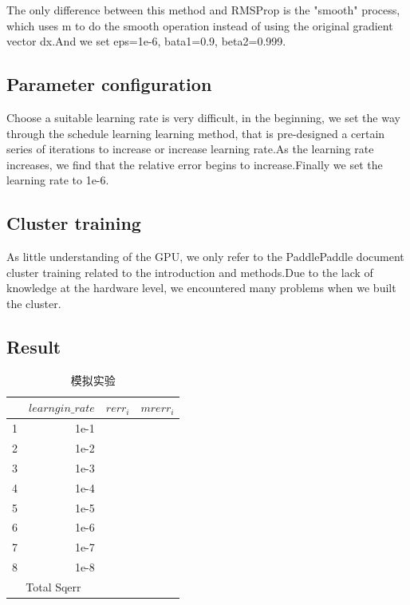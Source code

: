 \documentclass[conference,compsoc]{appendix/report}
\begin{document}
The only difference between this method and RMSProp is the "smooth" process, which uses m to do the smooth operation instead of using the original gradient vector dx.And we set eps=1e-6, bata1=0.9, beta2=0.999.


\subsection{Parameter configuration}
Choose a suitable learning rate is very difficult, in the beginning, we set the way through the schedule learning learning method, that is pre-designed a certain series of iterations to increase or increase learning rate.As the learning rate increases, we find that the relative error begins to increase.Finally we set the learning rate to 1e-6.

\subsection{Cluster training}
As little understanding of the GPU, we only refer to the PaddlePaddle document cluster training related to the introduction and methods.Due to the lack of knowledge at the hardware level, we encountered many problems when we built the cluster.

\subsection{Result}
\begin{table}[h]  %
\centering  %
\caption{模拟实验}  %
 \begin{tabular}{rrrr}  %
     \hline
     \hline
       & $learngin\_rate$ & ${rerr}_{i}$ & ${mrerr}_{i}$ \\ [0.5ex]  %
       \hline
       1 & 1e-1 &   &   \\
       2 & 1e-2 &   &   \\
       3 & 1e-3 &   &   \\
       4 & 1e-4 &   &   \\
       5 & 1e-5 &   &   \\
       6 & 1e-6 &   &   \\
       7 & 1e-7 &   &   \\
       8 & 1e-8 &   &   \\
       \hline
       \multicolumn{2}{c}{Total Sqerr} &   &   \\  %
       \hline
       \hline
   \end{tabular}
\end{table}
\end{document}
